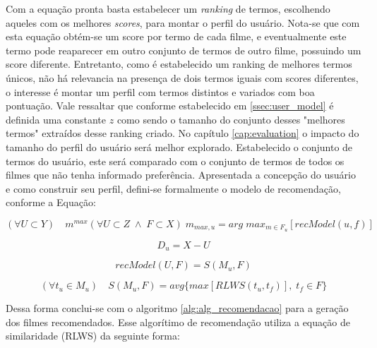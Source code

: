 Com a equação pronta basta estabelecer um \textit{ranking} de termos, escolhendo aqueles com os melhores \textit{scores}, para montar o perfil do usuário. Nota-se que com esta equação obtém-se um score por termo de cada filme, e eventualmente este termo pode reaparecer em outro conjunto de termos de outro filme, possuindo um score diferente. Entretanto, como é estabelecido um ranking de melhores termos únicos, não há relevancia na presença de dois termos iguais com scores diferentes, o interesse é montar um perfil com termos distintos e variados com boa pontuação. Vale ressaltar que conforme estabelecido em \ref{ssec:user_model} é definida uma constante $z$ como sendo o tamanho do conjunto desses "melhores termos" extraídos desse ranking criado. No capítulo \ref{cap:evaluation} o impacto do tamanho do perfil do usuário será melhor explorado. Estabelecido o conjunto de termos do usuário, este será comparado com o conjunto de termos de todos os filmes que não tenha informado preferência. Apresentada a concepção do usuário e como construir seu perfil, defini-se formalmente o modelo de recomendação, conforme a Equação:

\begin{equation}
	(\forall U \subset Y) \quad m^{max}
		
	(\forall U \subset Z\; \land \; F \subset X)\; m_{max, u} = arg \; max_{m \in F_u}[recModel(u, f)]
\label{eq:rec_model_max}
\end{equation}

\begin{equation}
	D_u = X - U
\label{eq:rec_model}
\end{equation}

\begin{equation}
	recModel(U, F) = S(M_u, F)
\label{eq:rec_model}
\end{equation}

\begin{equation}
	(\forall t_u \in M_u) \quad S(M_u, F) = avg \{max [RLWS(t_u, t_f)], \; t_f \in F\}
\label{eq:rec_model_similarity}
\end{equation}

Dessa forma conclui-se com o algoritmo \ref{alg:alg_recomendacao} para a geração dos filmes recomendados. Esse algorítimo de recomendação utiliza a equação de similaridade (\ac{RLWS}) da seguinte forma:

